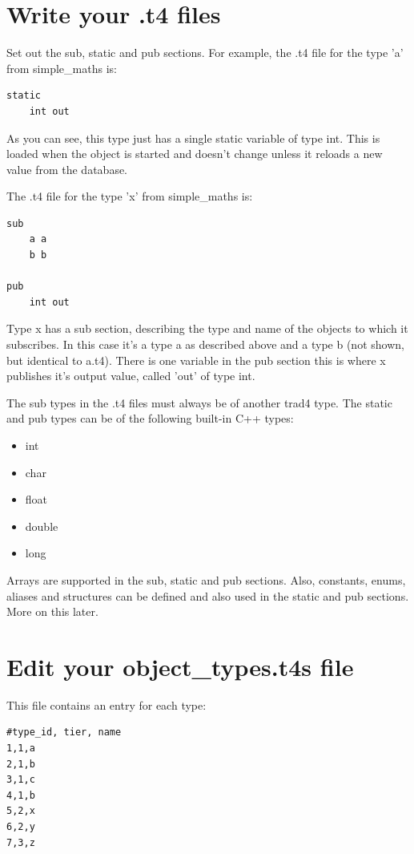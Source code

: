 \documentclass{report}
\begin{document}
\section{Write your .t4 files}

Set out the sub, static and pub sections. For example, the .t4 file for the type 'a' from simple_maths is:

\begin{verbatim}
static
    int out
\end{verbatim}

As you can see, this type just has a single static variable of type int. This is loaded when the object is started and doesn't change unless it reloads a new value from the database.

The .t4 file for the type 'x' from simple_maths is:

\begin{verbatim}
sub
    a a
    b b

pub 
    int out
\end{verbatim}

Type x has a sub section, describing the type and name of the objects to which it subscribes. In this case it's a type a as described above and a type b (not shown, but identical to a.t4). There is one variable in the pub section this is where x publishes it's output value, called 'out' of type int.

The sub types in the .t4 files must always be of another trad4 type. The static and pub types can be of the following built-in C++ types:

\begin{itemize}
\item int
\item char
\item float
\item double
\item long
\end{itemize}

Arrays are supported in the sub, static and pub sections. Also, constants, enums, aliases and structures can be defined and also used in the static and pub sections. More on this later.

\section{Edit your object_types.t4s file}

This file contains an entry for each type:
\begin{verbatim}
#type_id, tier, name
1,1,a
2,1,b
3,1,c
4,1,b
5,2,x
6,2,y
7,3,z
\end{verbatim}
\end{document}
